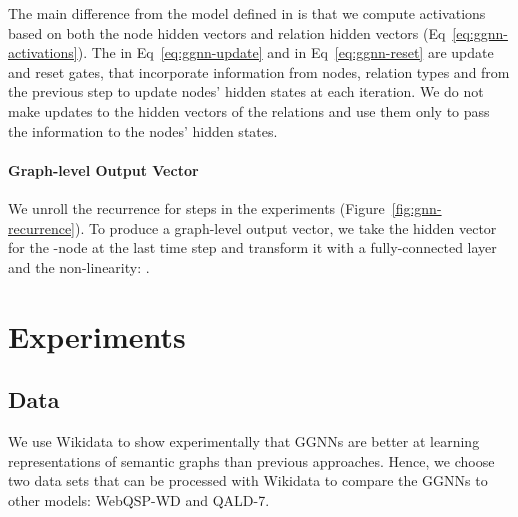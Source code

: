 \documentclass[11pt]{article}
\begin{document}
The main difference from the model defined in  is that we compute activations  based on both the node hidden vectors  and relation hidden vectors  (Eq~\ref{eq:ggnn-activations}). The  in Eq~\ref{eq:ggnn-update} and  in Eq~\ref{eq:ggnn-reset} are update and reset gates, that incorporate information from nodes, relation types and from the previous step to update nodes' hidden states at each iteration. We do not make updates to the hidden vectors of the relations and use them only to pass the information to the nodes' hidden states.   

\paragraph{Graph-level Output Vector} We unroll the recurrence for  steps in the experiments (Figure~\ref{fig:gnn-recurrence}). To produce a graph-level output vector, we take the hidden vector for the -node at the last time step  and transform it with a fully-connected layer and the  non-linearity:
.


\section{Experiments}

\subsection{Data}
\label{sec:datasets}

We use Wikidata to show experimentally that GGNNs are better at learning representations of semantic graphs than previous approaches. Hence, we choose two data sets that can be processed with Wikidata to compare the GGNNs to other models: WebQSP-WD and QALD-7.
\end{document}
